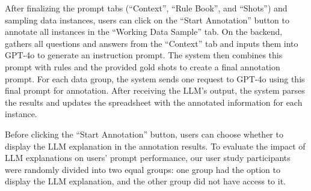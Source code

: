 


After finalizing the prompt tabs (``Context'', ``Rule Book'', and ``Shots'') and sampling data instances, users can click on the ``Start Annotation'' button to annotate all instances in the ``Working Data Sample'' tab. 
On the backend, \system gathers all questions and answers from the ``Context'' tab and inputs them into GPT-4o to generate an instruction prompt.
The system then combines this prompt with rules and the provided gold shots to create a final annotation prompt.
For each data group, the system sends one request to GPT-4o using this final prompt for annotation.
After receiving the LLM's output, the system parses the results and updates the spreadsheet with the annotated information for each instance.

Before clicking the ``Start Annotation'' button, users can choose whether to display the LLM explanation in the annotation results. To evaluate the impact of LLM explanations on users' prompt performance, our user study participants were randomly divided into two equal groups: one group had the option to display the LLM explanation, and the other group did not have access to it.